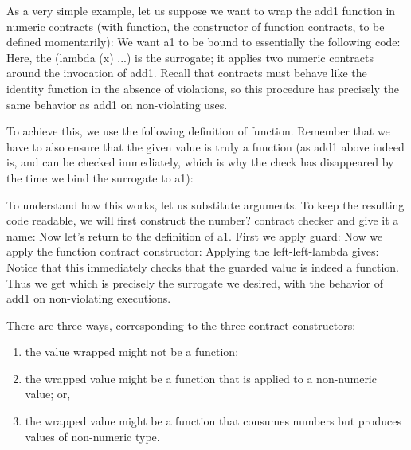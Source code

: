 As a very simple example, let us suppose we want to wrap the add1 function in
numeric contracts (with function, the constructor of function contracts, to be
defined momentarily):
We want a1 to be bound to essentially the following code:
Here, the (lambda (x) ...) is the surrogate; it applies two numeric contracts
around the invocation of add1. Recall that contracts must behave like the
identity function in the absence of violations, so this procedure has precisely
the same behavior as add1 on non-violating uses.

To achieve this, we use the following definition of function. Remember that we
have to also ensure that the given value is truly a function (as add1 above
indeed is, and can be checked immediately, which is why the check has
disappeared by the time we bind the surrogate to a1):

To understand how this works, let us substitute arguments. To keep the resulting
code readable, we will first construct the number? contract checker and give it
a name:
Now let’s return to the definition of a1. First we apply guard:
Now we apply the function contract constructor:
Applying the left-left-lambda gives:
Notice that this immediately checks that the guarded value is indeed a function.
Thus we get
which is precisely the surrogate we desired, with the behavior of add1 on
non-violating executions.


There are three ways, corresponding to the three contract constructors:
\begin{enumerate}[nosep]
  \item 
the value wrapped might not be a function;
  \item 
the wrapped value might be a function that is applied to a non-numeric value;
or,
  \item 
the wrapped value might be a function that consumes numbers but produces values
of non-numeric type.
\end{enumerate}



